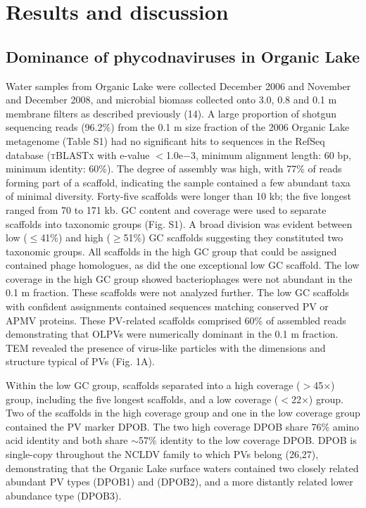 \section{Results and discussion}
\acresetall
\subsection{Dominance of phycodnaviruses in Organic Lake}
Water samples from Organic Lake were collected December 2006 and November and December 2008, and microbial biomass collected onto 3.0, 0.8 and 0.1 \textmu{}m membrane filters as described previously (14). 
A large proportion of shotgun sequencing reads (96.2\%) from the 0.1 \textmu{}m size fraction of the 2006 Organic Lake metagenome (Table S1) had no significant hits to sequences in the RefSeq database 
(\textsc{tBLASTx} with e-value $<$1.0e$-$3, minimum alignment length: 60 bp, minimum identity: 60\%). 
The degree of assembly was high, with 77\% of reads forming part of a scaffold, indicating the sample contained a few abundant taxa of minimal diversity. 
Forty-five scaffolds were longer than 10 kb; the five longest ranged from 70 to 171 kb. 
GC content and coverage were used to separate scaffolds into taxonomic groups (Fig. S1). 
A broad division was evident between low ($\le$41\%) and high ($\ge$51\%) GC scaffolds suggesting they constituted two taxonomic groups. 
All scaffolds in the high GC group that could be assigned contained phage homologues, as did the one exceptional low GC scaffold. 
The low coverage in the high GC group showed bacteriophages were not abundant in the 0.1 \textmu{}m fraction. 
These scaffolds were not analyzed further. 
The low GC scaffolds with confident assignments contained sequences matching conserved \ac{PV} or \ac{APMV} proteins. 
These \ac{PV}-related scaffolds comprised 60\% of assembled reads demonstrating that \acp{OLPV} were numerically dominant in the 0.1 \textmu{}m fraction. 
\ac{TEM} revealed the presence of virus-like particles with the dimensions and structure typical of PVs (Fig. 1A).

Within the low GC group, scaffolds separated into a high coverage ($>$45$\times$) group, including the five longest scaffolds, and a low coverage ($<$22$\times$) group. 
Two of the scaffolds in the high coverage group and one in the low coverage group contained the \ac{PV} marker \ac{DPOB}. 
The two high coverage \ac{DPOB} share 76\% amino acid identity and both share $\sim$57\% identity to the low coverage \ac{DPOB}. 
\ac{DPOB} is single-copy throughout the \ac{NCLDV} family to which \acp{PV} belong (26,27), 
demonstrating that the Organic Lake surface waters contained two closely related abundant \ac{PV} types (\ac{DPOB}1) and (\ac{DPOB}2), and a more distantly related lower abundance type (\ac{DPOB}3). 

